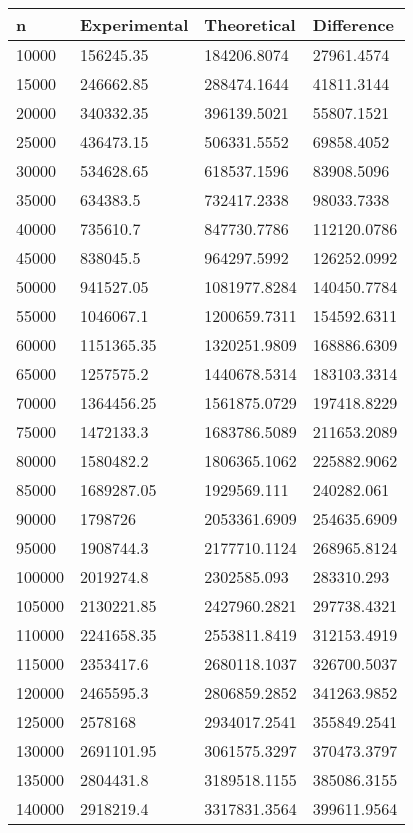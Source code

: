 \begin{tabular}{llll}
n & Experimental & Theoretical & Difference \\ 
\hline 
10000 & 156245.35 & 184206.8074 & 27961.4574 \\ 
15000 & 246662.85 & 288474.1644 & 41811.3144 \\ 
20000 & 340332.35 & 396139.5021 & 55807.1521 \\ 
25000 & 436473.15 & 506331.5552 & 69858.4052 \\ 
30000 & 534628.65 & 618537.1596 & 83908.5096 \\ 
35000 & 634383.5 & 732417.2338 & 98033.7338 \\ 
40000 & 735610.7 & 847730.7786 & 112120.0786 \\ 
45000 & 838045.5 & 964297.5992 & 126252.0992 \\ 
50000 & 941527.05 & 1081977.8284 & 140450.7784 \\ 
55000 & 1046067.1 & 1200659.7311 & 154592.6311 \\ 
60000 & 1151365.35 & 1320251.9809 & 168886.6309 \\ 
65000 & 1257575.2 & 1440678.5314 & 183103.3314 \\ 
70000 & 1364456.25 & 1561875.0729 & 197418.8229 \\ 
75000 & 1472133.3 & 1683786.5089 & 211653.2089 \\ 
80000 & 1580482.2 & 1806365.1062 & 225882.9062 \\ 
85000 & 1689287.05 & 1929569.111 & 240282.061 \\ 
90000 & 1798726 & 2053361.6909 & 254635.6909 \\ 
95000 & 1908744.3 & 2177710.1124 & 268965.8124 \\ 
100000 & 2019274.8 & 2302585.093 & 283310.293 \\ 
105000 & 2130221.85 & 2427960.2821 & 297738.4321 \\ 
110000 & 2241658.35 & 2553811.8419 & 312153.4919 \\ 
115000 & 2353417.6 & 2680118.1037 & 326700.5037 \\ 
120000 & 2465595.3 & 2806859.2852 & 341263.9852 \\ 
125000 & 2578168 & 2934017.2541 & 355849.2541 \\ 
130000 & 2691101.95 & 3061575.3297 & 370473.3797 \\ 
135000 & 2804431.8 & 3189518.1155 & 385086.3155 \\ 
140000 & 2918219.4 & 3317831.3564 & 399611.9564 \\ 

\end{tabular}
